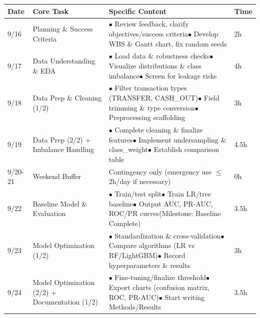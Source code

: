 \documentclass[sigplan,screen]{acmart}
\begin{document}
\begin{table}[h!]
    \centering
\tiny
\renewcommand{\arraystretch}{1.3}
\begin{tabular}{|p{1.0cm}|p{2.0cm}|p{3.5cm}|p{1.0cm}|}
\hline
\textbf{Date} & \textbf{Core Task} & \textbf{Specific Content} & \textbf{Time} \\
\hline
9/16 & Planning \& Success Criteria & $\bullet$ Review feedback, clarify objectives/success criteria\newline $\bullet$ Develop WBS \& Gantt chart, fix random seeds & 2h \\[2pt]
\hline
9/17 & Data Understanding \& EDA & $\bullet$ Load data \& robustness checks\newline $\bullet$ Visualize distributions \& class imbalance\newline $\bullet$ Screen for leakage risks & 4h \\[2pt]
\hline
9/18 & Data Prep \& Cleaning (1/2) & $\bullet$ Filter transaction types (TRANSFER, CASH\_OUT)\newline $\bullet$ Field trimming \& type conversion\newline $\bullet$ Preprocessing scaffolding & 3h \\[2pt]
\hline
9/19 & Data Prep (2/2) + Imbalance Handling & $\bullet$ Complete cleaning \& finalize features\newline $\bullet$ Implement undersampling \& class\_weight\newline $\bullet$ Establish comparison table & 4.5h \\[2pt]
\hline
9/20-21 & Weekend Buffer & Contingency only (emergency use $\leq$2h/day if necessary) & 0h \\[2pt]
\hline
9/22 & Baseline Model \& Evaluation & $\bullet$ Train/test split\newline $\bullet$ Train LR/tree baseline\newline $\bullet$ Output AUC, PR-AUC, ROC/PR curves\newline (Milestone: Baseline Complete) & 3.5h \\[2pt]
\hline
9/23 & Model Optimization (1/2) & $\bullet$ Standardization \& cross-validation\newline $\bullet$ Compare algorithms (LR vs RF/LightGBM)\newline $\bullet$ Record hyperparameters \& results & 3h \\[2pt]
\hline
9/24 & Model Optimization (2/2) + Documentation (1/2) & $\bullet$ Fine-tuning/finalize threshold\newline $\bullet$ Export charts (confusion matrix, ROC, PR-AUC)\newline $\bullet$ Start writing Methods/Results & 3.5h \\[2pt]

\end{tabular}
\end{table}
\end{document}
